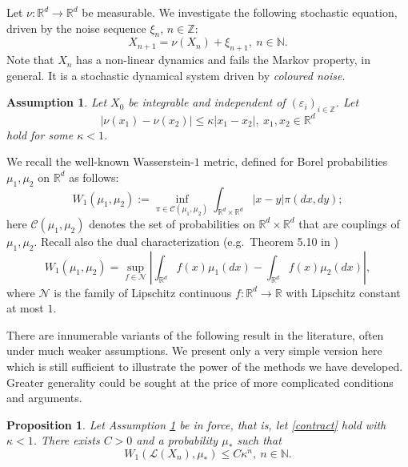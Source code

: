 \documentclass{article}
\newtheorem{proposition}[theorem]{Proposition}
\newtheorem{assumption}[theorem]{Assumption}
\begin{document}
Let $\nu:\mathbb{R}^{d}\to \mathbb{R}^{d}$ be measurable. 
We investigate the following stochastic equation, driven by the noise sequence
$\xi_{n}$, $n\in\mathbb{Z}$:
\begin{equation}\label{eqi}
X_{n+1}=\nu(X_{n})+\xi_{n+1},\ n\in\mathbb{N}.
\end{equation}
Note that $X_{n}$ has a non-linear dynamics and fails the Markov property, in general. It is a stochastic
dynamical system driven by \emph{coloured noise}.

\begin{assumption}\label{contractivity}
Let $X_{0}$ be integrable and independent of $(\varepsilon_{i})_{i\in\mathbb{Z}}$.
Let
\begin{equation}\label{contract}
|\nu(x_{1})-\nu(x_{2})|\leq \kappa |x_{1}-x_{2}|,\ x_{1},x_{2}\in\mathbb{R}^{d}	
\end{equation} 
hold for some $\kappa<1$. 
\end{assumption}

We recall the well-known Wasserstein-$1$ metric, defined for Borel probabilities $\mu_{1},\mu_{2}$ on $\mathbb{R}^{d}$
as follows:
$$
W_{1}(\mu_{1},\mu_{2}):=\inf_{\pi\in \mathcal{C}(\mu_{1},\mu_{2})}\int_{\mathbb{R}^{d}\times\mathbb{R}^{d}}
|x-y|\pi(dx,dy);
$$
here $\mathcal{C}(\mu_{1},\mu_{2})$ denotes the set of probabilities on $\mathbb{R}^{d}\times\mathbb{R}^{d}$
that are couplings of $\mu_{1},\mu_{2}$. Recall also the dual characterization (e.g.\ Theorem 5.10 in \cite{villani})
\begin{equation}\label{kr}
W_{1}(\mu_{1},\mu_{2})=\sup_{f\in\mathcal{N}}\left|\int_{\mathbb{R}^{d}}f(x)\mu_{1}(dx)-\int_{\mathbb{R}^{d}}f(x)\mu_{2}(dx)\right|,
\end{equation}
where $\mathcal{N}$ is the family of Lipschitz continuous $f:\mathbb{R}^{d}\to\mathbb{R}$ with Lipschitz constant at most $1$.


There are innumerable variants of the following result in the literature, often under much weaker assumptions.
We present only a very simple version here which is still sufficient to illustrate the power of the methods we have developed.
Greater generality could be sought at the price of more complicated conditions and arguments.

\begin{proposition}\label{limd} Let Assumption \ref{contractivity} be in force, that is, let \eqref{contract} hold with $\kappa<1$.
There exists $C>0$ and a probability $\mu_{*}$ such that
$$
W_{1}(\mathcal{L}(X_{n}),\mu_{*})\leq C\kappa^{n},\ n\in\mathbb{N}.
$$
\end{proposition}
\end{document}
